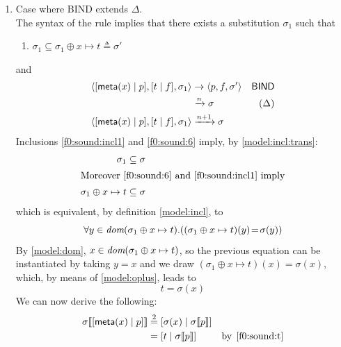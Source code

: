 \begin{enumerate}
\begin{enumerate}
      \item Case where \textsf{BIND} extends \(\Delta\).\\ The syntax
        of the rule implies that there exists a substitution
        \(\sigma_1\) such that
        \begin{enumerate}

          \item \(\sigma_1 \subseteq \sigma_1 \oplus x \mapsto t \triangleq
          \sigma'\) \label{f0:sound:incl1}

        \end{enumerate}
        and
        \begin{align}
           \match{\cons{t}{f}}{\cons{\meta{x}}{p}}{\sigma_1}
          &\rightarrow
           \match{f}{p}{\sigma'}
          &\textsf{BIND} \notag\\
          &\xrightarrow{n} \sigma
          & (\Delta) \notag\\
           \match{\cons{t}{f}}{\cons{\meta{x}}{p}}{\sigma_1}
           &\xrightarrow{n+1} \sigma \label{f0:sound:BIND}
        \end{align}
        Inclusions \ref{f0:sound:incl1} and \eqref{f0:sound:6} imply, by
        \eqref{model:incl:trans}:
        \begin{align}
          \sigma_1 \subseteq \sigma \label{f0:sound:incl2}\\
          \intertext{Moreover \eqref{f0:sound:6} and \ref{f0:sound:incl1}
            imply}
          \sigma_1 \oplus x \mapsto t \subseteq \sigma\notag
        \end{align}
        which is equivalent, by definition \eqref{model:incl}, to
        \[
        \forall y \in \dom{\sigma_1 \oplus x \mapsto t}.((\sigma_1
        \oplus x \mapsto t)(y) \!=\! \sigma(y))
        \]
        By \eqref{model:dom}, \(x \in \dom{\sigma_1 \oplus x \mapsto
          t}\), so the previous equation can be instantiated by taking
        \(y = x\) and we draw \((\sigma_1 \oplus x \mapsto t)(x) =
        \sigma(x)\), which, by means of \eqref{model:oplus}, leads to
        \begin{equation}
          t = \sigma(x) \label{f0:sound:t}
        \end{equation}
        We can now derive the following:
        \begin{align}
            \subst{\cons{\meta{x}}{p}}{\sigma}
          &\eqn{2} \cons{\sigma(x)}{\subst{p}{\sigma}}\notag\\
          &= \cons{t}{\subst{p}{\sigma}}
          &\text{by} \,\; \eqref{f0:sound:t}\notag\\

\end{align}
\end{enumerate}
\end{enumerate}

